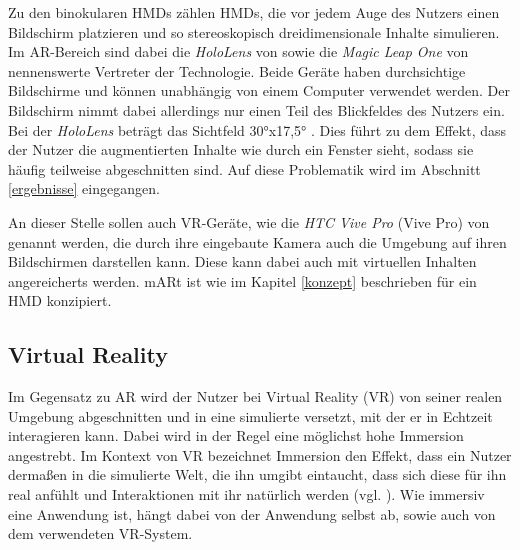 Zu den binokularen HMDs zählen HMDs, die vor jedem Auge des Nutzers einen Bildschirm platzieren und so stereoskopisch dreidimensionale Inhalte simulieren. Im AR-Bereich sind dabei die \textit{HoloLens} von \cite{hololens} sowie die \textit{Magic Leap One} von \cite{magicLeap} nennenswerte Vertreter der Technologie. Beide Geräte haben durchsichtige Bildschirme und können unabhängig von einem Computer verwendet werden. 
Der Bildschirm nimmt dabei allerdings nur einen Teil des Blickfeldes des Nutzers ein. Bei der \textit{HoloLens} beträgt das Sichtfeld 30°x17,5° \cite{hololensFOV}. Dies führt zu dem Effekt, dass der Nutzer die augmentierten Inhalte wie durch ein Fenster sieht, sodass sie häufig teilweise abgeschnitten sind. Auf diese Problematik wird im Abschnitt \ref{ergebnisse} eingegangen. 

An dieser Stelle sollen auch VR-Geräte, wie die \textit{HTC Vive Pro} (Vive Pro) von \cite{vivePro} genannt werden, die durch ihre eingebaute Kamera auch die Umgebung auf ihren Bildschirmen darstellen kann. Diese kann dabei auch mit virtuellen Inhalten angereicherts werden. 
mARt ist wie im Kapitel \ref{konzept} beschrieben für ein HMD konzipiert.


\subsection{Virtual Reality}
\label{vr}

Im Gegensatz zu AR wird der Nutzer bei Virtual Reality (VR) von seiner realen Umgebung abgeschnitten und in eine simulierte versetzt, mit der er in Echtzeit interagieren kann. Dabei wird in der Regel eine möglichst hohe Immersion angestrebt. 
Im Kontext von VR bezeichnet Immersion den Effekt, dass ein Nutzer dermaßen in die simulierte Welt, die ihn umgibt eintaucht, dass sich diese für ihn real anfühlt und Interaktionen mit ihr natürlich werden (vgl. \cite{Witmer98}). Wie immersiv eine Anwendung ist, hängt dabei von der Anwendung selbst ab, sowie auch von dem verwendeten VR-System. 

